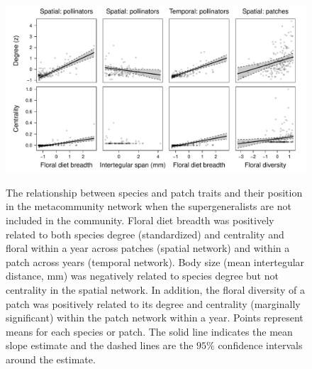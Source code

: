 \documentclass{article}\usepackage[]{graphicx}\usepackage[]{color}
\begin{document}
\begin{figure}
\centering
\includegraphics[width=1\textwidth]{figure/all_sig_drop_li_htTRUE.pdf}
\label{fig:connectivity}
\caption{The relationship between species and patch traits and their
position in the metacommunity network when the supergeneralists
are not included in the community. Floral diet breadth was positively related to both species degree (standardized) and centrality and floral within a year across patches (spatial network) and within a patch across years (temporal network). Body size (mean intertegular distance, mm) was negatively related to species degree but not centrality in the spatial network.  In addition, the floral diversity of a patch was positively  related to its degree and centrality (marginally significant) within the patch network within a year. Points represent means for each species or patch. The solid line indicates the mean slope estimate and the dashed lines are the $95\%$ confidence intervals around the estimate.}
\end{figure}
\clearpage


\clearpage

\clearpage
\end{document}
